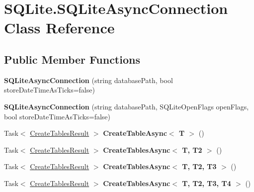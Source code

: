 \hypertarget{classSQLite_1_1SQLiteAsyncConnection}{}\section{S\+Q\+Lite.\+S\+Q\+Lite\+Async\+Connection Class Reference}
\label{classSQLite_1_1SQLiteAsyncConnection}
\subsection*{Public Member Functions}
\begin{DoxyCompactItemize}
\item 
\hypertarget{classSQLite_1_1SQLiteAsyncConnection_a6b26a70d833ede366339dcdf0ac4ddec}{}{\bfseries S\+Q\+Lite\+Async\+Connection} (string database\+Path, bool store\+Date\+Time\+As\+Ticks=false)\label{classSQLite_1_1SQLiteAsyncConnection_a6b26a70d833ede366339dcdf0ac4ddec}

\item 
\hypertarget{classSQLite_1_1SQLiteAsyncConnection_abf2621d98094e8cc5702655eec267cec}{}{\bfseries S\+Q\+Lite\+Async\+Connection} (string database\+Path, S\+Q\+Lite\+Open\+Flags open\+Flags, bool store\+Date\+Time\+As\+Ticks=false)\label{classSQLite_1_1SQLiteAsyncConnection_abf2621d98094e8cc5702655eec267cec}

\item 
\hypertarget{classSQLite_1_1SQLiteAsyncConnection_a120dc02c80780a01f9158aa2dc4110e3}{}Task$<$ \hyperlink{classSQLite_1_1CreateTablesResult}{Create\+Tables\+Result} $>$ {\bfseries Create\+Table\+Async$<$ T $>$} ()\label{classSQLite_1_1SQLiteAsyncConnection_a120dc02c80780a01f9158aa2dc4110e3}

\item 
\hypertarget{classSQLite_1_1SQLiteAsyncConnection_a1911c2250387bf7db96a05d4ab73bfe7}{}Task$<$ \hyperlink{classSQLite_1_1CreateTablesResult}{Create\+Tables\+Result} $>$ {\bfseries Create\+Tables\+Async$<$ T, T2 $>$} ()\label{classSQLite_1_1SQLiteAsyncConnection_a1911c2250387bf7db96a05d4ab73bfe7}

\item 
\hypertarget{classSQLite_1_1SQLiteAsyncConnection_a0d18028757d84c1d5ef6b4f0a2f31bf8}{}Task$<$ \hyperlink{classSQLite_1_1CreateTablesResult}{Create\+Tables\+Result} $>$ {\bfseries Create\+Tables\+Async$<$ T, T2, T3 $>$} ()\label{classSQLite_1_1SQLiteAsyncConnection_a0d18028757d84c1d5ef6b4f0a2f31bf8}

\item 
\hypertarget{classSQLite_1_1SQLiteAsyncConnection_a36ed358566d4c64e0bf524c7d8c681a4}{}Task$<$ \hyperlink{classSQLite_1_1CreateTablesResult}{Create\+Tables\+Result} $>$ {\bfseries Create\+Tables\+Async$<$ T, T2, T3, T4 $>$} ()\label{classSQLite_1_1SQLiteAsyncConnection_a36ed358566d4c64e0bf524c7d8c681a4}


\end{DoxyCompactItemize}
